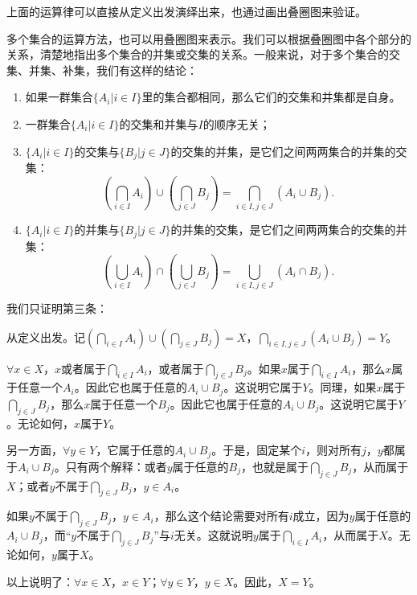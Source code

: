 \documentclass[12pt,UTF8]{ctexbook}
\begin{document}
上面的运算律可以直接从定义出发演绎出来，也通过画出叠圈图来验证。

多个集合的运算方法，也可以用叠圈图来表示。我们可以根据叠圈图中各个部分的关系，清楚地指出多个集合的并集或交集的关系。一般来说，对于多个集合的交集、并集、补集，我们有这样的结论：

\begin{enumerate}
    \item 如果一群集合$\{A_i | i \in I\}$里的集合都相同，那么它们的交集和并集都是自身。
    \item 一群集合$\{A_i | i \in I\}$的交集和并集与$I$的顺序无关；
    \item $\{A_i | i \in I\}$的交集与$\{B_j | j \in J\}$的交集的并集，是它们之间两两集合的并集的交集：
    $$ \left(\bigcap_{i\in I} A_i \right) \cup  \left(\bigcap_{j\in J} B_j \right) = \bigcap_{i\in I,j\in J} (A_i \cup B_j). $$
    \item $\{A_i | i \in I\}$的并集与$\{B_j | j \in J\}$的并集的交集，是它们之间两两集合的交集的并集：
    $$ \left(\bigcup_{i\in I} A_i \right) \cap  \left(\bigcup_{j\in J} B_j \right) = \bigcup_{i\in I,j\in J} (A_i \cap B_j). $$
\end{enumerate}

我们只证明第三条：
\begin{so}
    从定义出发。记$\left(\bigcap_{i\in I} A_i \right) \cup  \left(\bigcap_{j\in J} B_j \right) = X$，$\bigcap_{i\in I,j\in J} (A_i \cup B_j) = Y$。
    
    $\forall x \in X$，$x$或者属于$\bigcap_{i\in I} A_i$，或者属于$\bigcap_{j\in J} B_j$。如果$x$属于$\bigcap_{i\in I} A_i$，那么$x$属于任意一个$A_i$。因此它也属于任意的$A_i \cup B_j$。这说明它属于$Y$。同理，如果$x$属于$\bigcap_{j\in J} B_j$，那么$x$属于任意一个$B_j$。因此它也属于任意的$A_i \cup B_j$。这说明它属于$Y$。无论如何，$x$属于$Y$。

    另一方面，$\forall y \in Y$，它属于任意的$A_i \cup B_j$。于是，固定某个$i$，则对所有$j$，$y$都属于$A_i \cup B_j$。只有两个解释：或者$y$属于任意的$B_j$，也就是属于$\bigcap_{j\in J} B_j$，从而属于$X$；或者$y$不属于$\bigcap_{j\in J} B_j$，$y\in A_i$。
    
    如果$y$不属于$\bigcap_{j\in J} B_j$，$y\in A_i$，那么这个结论需要对所有$i$成立，因为$y$属于任意的$A_i \cup B_j$，而“$y$不属于$\bigcap_{j\in J} B_j$”与$i$无关。这就说明$y$属于$\bigcap_{i\in I} A_i$，从而属于$X$。无论如何，$y$属于$X$。

    以上说明了：$\forall x \in X$，$x\in Y$；$\forall y \in Y$，$y\in X$。因此，$X=Y$。

\end{so}
\end{document}
